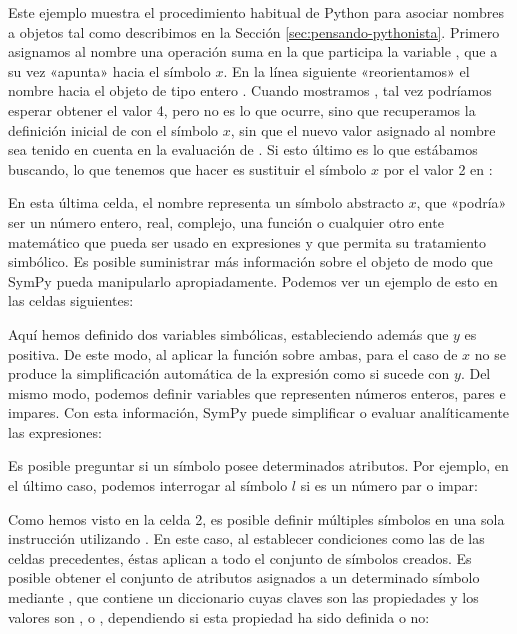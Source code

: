 Este ejemplo muestra el procedimiento habitual de Python para asociar nombres a objetos tal como describimos en la Sección \ref{sec:pensando-pythonista}. Primero asignamos al nombre  una operación suma en la que participa la variable , que a su vez «apunta» hacia el símbolo $x$. En la línea siguiente «reorientamos» el nombre  hacia el objeto de tipo entero . Cuando mostramos , tal vez podríamos esperar obtener el valor 4, pero no es lo que ocurre, sino que recuperamos la definición inicial de  con el símbolo $x$, sin que el nuevo valor asignado al nombre  sea tenido en cuenta en la evaluación de . Si esto último es lo que estábamos buscando, lo que tenemos que hacer es sustituir el símbolo $x$ por el valor 2 en :


En esta última celda, el nombre  representa un símbolo abstracto $x$, que «podría» ser un número entero, real, complejo, una función o cualquier otro ente matemático que pueda ser usado en expresiones y que permita su tratamiento simbólico. Es posible suministrar más información sobre el objeto de modo que SymPy pueda manipularlo apropiadamente. Podemos ver un ejemplo de esto en las celdas siguientes:


Aquí hemos definido dos variables simbólicas, estableciendo además que $y$ es positiva. De este modo, al aplicar la función  sobre ambas, para el caso de $x$ no se produce la simplificación automática de la expresión como si sucede con $y$. Del mismo modo, podemos definir variables que representen números enteros, pares e impares. Con esta información, SymPy puede simplificar o evaluar analíticamente las expresiones:


Es posible preguntar si un símbolo posee determinados atributos. Por ejemplo, en el último caso, podemos interrogar al símbolo $l$ si es un número par o impar:


Como hemos visto en la celda 2, es posible definir múltiples símbolos en una sola instrucción utilizando . En este caso, al establecer condiciones como las de las celdas precedentes, éstas aplican a todo el conjunto de símbolos creados. Es posible obtener el conjunto de atributos asignados a un determinado símbolo mediante , que contiene un diccionario cuyas claves son las propiedades y los valores son ,  o , dependiendo si esta propiedad ha sido definida o no:

